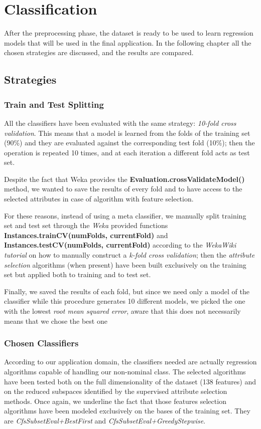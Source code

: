 \section{Classification}
After the preprocessing phase, the dataset is ready to be used to learn regression models that will be used in the final application. In the following chapter all the chosen strategies are discussed, and the results are compared.



\subsection{Strategies}
\subsubsection{Train and Test Splitting}
All the classifiers have been evaluated with the same strategy: \textit{10-fold cross validation}. This means that a model is learned from the folds of the training set (90\%) and they are evaluated against the corresponding test fold (10\%); then the operation is repeated 10 times, and at each iteration a different fold acts as test set.

Despite the fact that Weka provides the \textbf{Evaluation.crossValidateModel()} method, we wanted to save the results of every fold and to have access to the selected attributes in case of algorithm with feature selection.

For these reasons, instead of using a meta classifier, we manually split training set and test set through the \textit{Weka} provided functions \textbf{Instances.trainCV(numFolds, currentFold)} and \textbf{Instances.testCV(numFolds, currentFold)} according to the \textit{WekaWiki tutorial} on how to manually construct a \textit{k-fold cross validation}; then the \textit{attribute selection} algorithms (when present) have been built exclusively on the training set but applied both to training and to test set.

Finally, we saved the results of each fold, but since we need only a model of the classifier while this procedure generates 10 different models, we picked the one with the lowest \textit{root mean squared error}, aware that this does not necessarily means that we chose the best one



\subsubsection{Chosen Classifiers}
According to our application domain, the classifiers needed are actually regression algorithms capable of handling our non-nominal class. The selected algorithms have been tested both on the full dimensionality of the dataset (138 features) and on the reduced subspaces identified by the supervised attribute selection methods. Once again, we underline the fact that those features selection algorithms have been modeled exclusively on the bases of the training set. They are \textit{CfsSubsetEval+BestFirst} and \textit{CfsSubsetEval+GreedyStepwise}.

